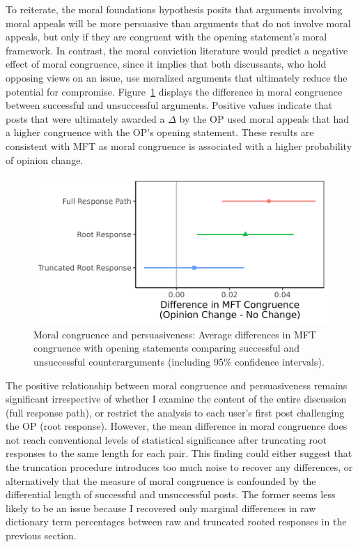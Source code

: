 To reiterate, the moral foundations hypothesis posits that arguments involving moral appeals will be more persuasive than arguments that do not involve moral appeals, but only if they are congruent with the opening statement's moral framework. In contrast, the moral conviction literature would predict a negative effect of moral congruence, since it implies that both discussants, who hold opposing views on an issue, use moralized arguments that ultimately reduce the potential for compromise. Figure~\ref{fig:cosine} displays the difference in moral congruence between successful and unsuccessful arguments. Positive values indicate that posts that were ultimately awarded a $\Delta$ by the OP used moral appeals that had a higher congruence with the OP's opening statement. These results are consistent with MFT as moral congruence is associated with a higher probability of opinion change.

\begin{figure}[ht]
\centering
\includegraphics{fig7-cosine_political.png}
\caption[Moral congruence and persuasiveness]{Moral congruence and persuasiveness: Average differences in MFT congruence with opening statements comparing successful and unsuccessful counterarguments (including 95\% confidence intervals).}\label{fig:cosine}
\end{figure}

The positive relationship between moral congruence and persuasiveness remains significant irrespective of whether I examine the content of the entire discussion (full response path), or restrict the analysis to each user's first post challenging the OP (root response). However, the mean difference in moral congruence does not reach conventional levels of statistical significance after truncating root responses to the same length for each pair. This finding could either suggest that the truncation procedure introduces too much noise to recover any differences, or alternatively that the measure of moral congruence is confounded by the differential length of successful and unsuccessful posts. The former seems less likely to be an issue because I recovered only marginal differences in raw dictionary term percentages between raw and truncated rooted responses in the previous section.

